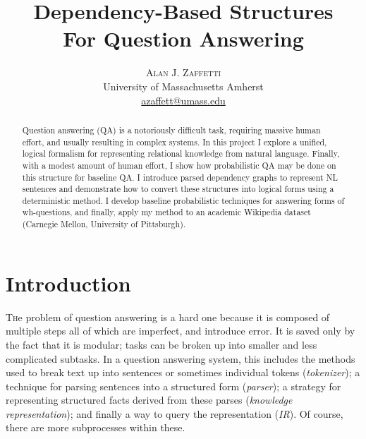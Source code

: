 \documentclass[twoside]{article}
\title{\vspace{-5mm}\fontsize{18pt}{10pt}\selectfont\textbf{Dependency-Based Structures\\For Question Answering}} %
\author{
\large
\textsc{Alan J. Zaffetti}\\[2mm]%
\normalsize University of Massachusetts Amherst \\ %
\normalsize \href{mailto:azaffett@umass.edu}{azaffett@umass.edu} %
}
\date{}
\begin{document}
\maketitle %

\thispagestyle{fancy} %


\begin{abstract}

\noindent Question answering (QA) is a notoriously difficult task, requiring massive human effort, and usually resulting in complex systems.  In this project I explore a unified, logical formalism for representing relational knowledge from natural language.  Finally, with a modest amount of human effort, I show how probabilistic QA may be done on this structure for baseline QA.  I introduce parsed dependency graphs to represent NL sentences and demonstrate how to convert these structures into logical forms using a deterministic method.  I develop baseline probabilistic techniques for answering forms of wh-questions, and finally, apply my method to an academic Wikipedia dataset (Carnegie Mellon, University of Pittsburgh).

\end{abstract}


\section{Introduction}

\lettrine[nindent=0em,lines=3]{T}he problem of question answering is a hard one because it is composed of multiple steps all of which are imperfect, and introduce error.  It is saved only by the fact that it is modular; tasks can be broken up into smaller and less complicated subtasks.  In a question answering system, this includes the methods used to break text up into sentences or sometimes individual tokens (\textit{tokenizer}); a technique for parsing sentences into a structured form (\textit{parser}); a strategy for representing structured facts derived from these parses (\textit{knowledge representation}); and finally a way to query the representation (\textit{IR}). Of course, there are more subprocesses within these.
\end{document}
